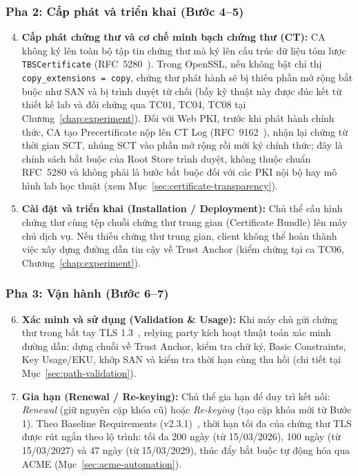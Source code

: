 \subsubsection*{Pha 2: Cấp phát và triển khai (Bước 4--5)}
\begin{enumerate}
    \setcounter{enumi}{3}
    \item \textbf{Cấp phát chứng thư và cơ chế minh bạch chứng thư (CT):} CA không ký lên toàn bộ tập tin chứng thư mà ký lên cấu trúc dữ liệu tóm lược \texttt{TBSCertificate} (RFC~5280~\cite{rfc5280}). Trong OpenSSL, nếu không bật chỉ thị \texttt{copy\_extensions = copy}, chứng thư phát hành sẽ bị thiếu phần mở rộng bắt buộc như SAN và bị trình duyệt từ chối (bẫy kỹ thuật này được đúc kết từ thiết kế lab và đối chứng qua TC01, TC04, TC08 tại Chương~\ref{chap:experiment}). Đối với Web PKI, trước khi phát hành chính thức, CA tạo Precertificate nộp lên CT Log (RFC~9162~\cite{rfc9162}), nhận lại chứng từ thời gian SCT, nhúng SCT vào phần mở rộng rồi mới ký chính thức; đây là chính sách bắt buộc của Root Store trình duyệt, không thuộc chuẩn RFC~5280 và không phải là bước bắt buộc đối với các PKI nội bộ hay mô hình lab học thuật (xem Mục~\ref{sec:certificate-transparency}).
    \item \textbf{Cài đặt và triển khai (Installation / Deployment):} Chủ thể cấu hình chứng thư cùng tệp chuỗi chứng thư trung gian (Certificate Bundle) lên máy chủ dịch vụ. Nếu thiếu chứng thư trung gian, client không thể hoàn thành việc xây dựng đường dẫn tin cậy về Trust Anchor (kiểm chứng tại ca TC06, Chương~\ref{chap:experiment}).
\end{enumerate}

\subsubsection*{Pha 3: Vận hành (Bước 6--7)}
\begin{enumerate}
    \setcounter{enumi}{5}
    \item \textbf{Xác minh và sử dụng (Validation \& Usage):} Khi máy chủ gửi chứng thư trong bắt tay TLS 1.3~\cite{rfc8446}, relying party kích hoạt thuật toán xác minh đường dẫn: dựng chuỗi về Trust Anchor, kiểm tra chữ ký, Basic Constraints, Key Usage/EKU, khớp SAN và kiểm tra thời hạn cùng thu hồi (chi tiết tại Mục~\ref{sec:path-validation}).
    \item \textbf{Gia hạn (Renewal / Re-keying):} Chủ thể gia hạn để duy trì kết nối: \textit{Renewal} (giữ nguyên cặp khóa cũ) hoặc \textit{Re-keying} (tạo cặp khóa mới từ Bước 1). Theo Baseline Requirements (v2.3.1)~\cite{cabforum_br}, thời hạn tối đa của chứng thư TLS được rút ngắn theo lộ trình: tối đa 200 ngày (từ 15/03/2026), 100 ngày (từ 15/03/2027) và 47 ngày (từ 15/03/2029), thúc đẩy bắt buộc tự động hóa qua ACME (Mục~\ref{sec:acme-automation}).
\end{enumerate}

